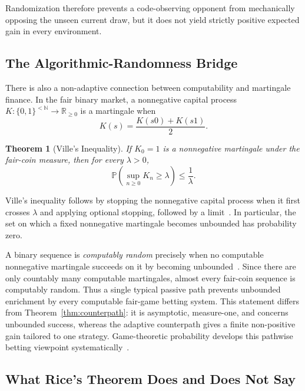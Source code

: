\documentclass[aps,pra,reprint,superscriptaddress,amsmath,amssymb]{revtex4-2}
\theoremstyle{plain}
\newtheorem{theorem}{Theorem}
\theoremstyle{definition}
\theoremstyle{remark}
\begin{document}
Randomization therefore prevents a code-observing opponent from mechanically
opposing the unseen current draw, but it does not yield strictly positive
expected gain in every environment.

\subsection{The Algorithmic-Randomness Bridge}

There is also a non-adaptive connection between computability and martingale
finance. In the fair binary market, a nonnegative capital process
\(K\colon\{0,1\}^{<\mathbb{N}}\to\mathbb{R}_{\geq0}\) is a martingale when
\begin{equation}
  K(s)=\frac{K(s0)+K(s1)}2.
  \label{eq:computablemartingale}
\end{equation}

\begin{theorem}[Ville's Inequality]
  \label{thm:ville}
  If \(K_0=1\) is a nonnegative martingale under the fair-coin measure, then
  for every \(\lambda>0\),
  \begin{equation}
    \mathbb{P}\!\left(\sup_{n\geq0}K_n\geq\lambda\right)
    \leq\frac1\lambda.
    \label{eq:ville}
  \end{equation}
\end{theorem}

Ville's inequality follows by stopping the nonnegative capital process when it
first crosses \(\lambda\) and applying optional stopping, followed by a
limit~\cite{Ville1939}. In particular, the set on which a fixed nonnegative
martingale becomes unbounded has probability zero.

A binary sequence is \emph{computably random} precisely when no computable
nonnegative martingale succeeds on it by becoming unbounded~\cite{schnorr1,DH}.
Since there are only countably many computable
martingales, almost every fair-coin sequence is computably random. Thus a
single typical passive path prevents unbounded enrichment by every computable
fair-game betting system. This statement differs from
Theorem~\ref{thm:counterpath}: it is asymptotic, measure-one, and concerns
unbounded success, whereas the adaptive counterpath gives a finite
non-positive gain tailored to one strategy. Game-theoretic probability
develops this pathwise betting viewpoint systematically~\cite{ShaferVovk2001}.

\subsection{What Rice's Theorem Does and Does Not Say}
\end{document}
